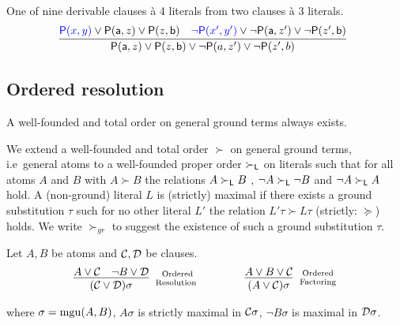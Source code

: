 \begin{example}\label{ex:resolution:9a4}
	One of {\myem nine} derivable clauses à 4 literals from two clauses à 3 literals.
	\begin{gather*}
	\infer[]{\mP(\ma,z)\lor\mP(z,\mb)\lor\lnot\mP(a,z')\lor\lnot\mP(z',b)}
	{{\colN\mP(x,y)}\lor\mP(\ma,z)\lor\mP(z,\mb) & {\colN\lnot\mP(x',y')}\lor\lnot\mP(\ma,z')\lor\lnot\mP(z',\mb)}
	\end{gather*}
\end{example}

\subsection{Ordered resolution}\label{sec:ordered:resolution}

\begin{lemma}A well-founded and total order on general ground terms always exists.\end{lemma}

\begin{definition}\label{def:orders-on-literals}
	We extend a well-founded and total order $\succ$ on general ground terms,
	i.e~general atoms to a well-founded proper order $\succ_{\mathsf{L}}$
	on literals such that for all atoms $A$ and $B$ with $A\succ B$
	the relations $A\succ_{\mathsf{L}} B$ ,
	$\lnot A\succ_{\mathsf{L}}\lnot B$ and
	$\lnot A\succ_{\mathsf{L}} A$ hold.
	A (non-ground) literal $L$ is {\myem (strictly) maximal} if there exists a ground substitution $\tau$
	such for no other literal $L'$ the relation $L'\tau\succ L\tau$ (strictly: $\succcurlyeq$) holds.
	We write $\succ_{gr}$ to suggest the existence of such a ground substitution $\tau$.
\end{definition}

\begin{definition}\label{def:ordered:resolution}
	Let $A, B$ be atoms and $\mathcal{C},\mathcal{D}$ be clauses.
	\begin{gather*}
	\infer
	[\text{Ordered}\atop\text{Resolution	}]
	{(\mcC\lor\mcD)\sigma}
	{A\lor\mcC&\lnot B\lor\mcD}
	\qquad\qquad
	\infer
	[\text{Ordered}\atop\text{Factoring}]
	{(A\lor\mcC)\sigma}
	{A\lor B\lor\mcC}
	\end{gather*}
	\begin{center}
		where $\sigma=\operatorname{mgu}(A,B)$,
		$A\sigma$ is strictly maximal in $\mathcal{C}\sigma$,
		$\lnot B\sigma$ is maximal in $\mathcal{D}\sigma$.
	\end{center}
\end{definition}

